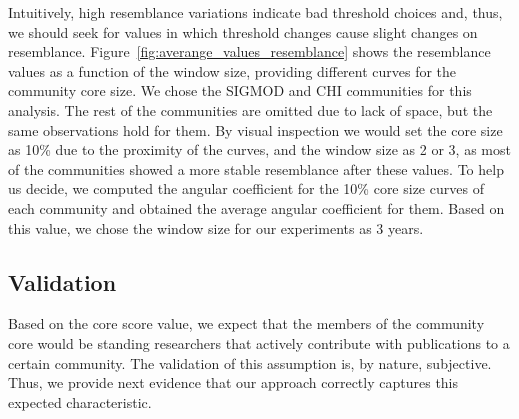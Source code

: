 \documentclass[letterpaper]{www13-companion-accepted}
\begin{document}
Intuitively, high resemblance variations indicate bad threshold choices and, thus, we should seek for values in which threshold changes cause slight changes on resemblance.
Figure~\ref{fig:averange_values_resemblance} shows the resemblance values as a function of the window size, providing different curves for the community core size.  We chose the
SIGMOD and CHI communities for this analysis. The rest of the communities are omitted due to lack of space, but the same observations hold for them. By visual inspection we would set the core
size as 10\% due to the proximity of the curves, and the window size as 2 or 3, as most of the communities showed a more stable resemblance after these values. To help us decide, we
computed the angular coefficient for the 10\% core size curves of each community and obtained the average angular coefficient for them.  Based on this value, we chose the window
size for our experiments as 3 years.


\subsection{Validation}

Based on the core score value, we expect that the members of the community core would be standing researchers that actively contribute with publications to a certain community.
The validation of this assumption is, by nature, subjective.  Thus, we provide next evidence that our approach correctly captures this expected characteristic.
\end{document}
